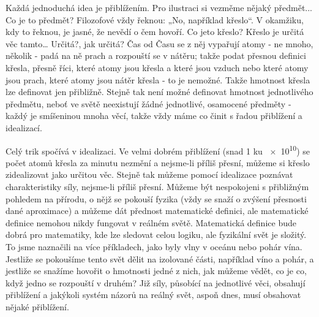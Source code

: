 {    Každá jednoduchá idea je přiblížením. Pro ilustraci si vezměme nějaký předmět... Co je to 
    předmět? Filozofové vždy řeknou: „No, například křeslo“. V okamžiku, kdy to řeknou, je jasné, 
    že nevědí o čem hovoří. Co jeto křeslo? Křeslo je určitá věc tamto… Určitá?, jak určitá? Čas od 
    Času se z něj vypařují atomy - ne mnoho, několik - padá na ně prach a rozpouští se v nátěru; 
    takže podat přesnou definici křesla, přesně říci, které atomy jsou křesla a které jsou vzduch 
    nebo které atomy jsou prach, které atomy jsou nátěr křesla - to je nemožné. Takže hmotnost 
    křesla lze definovat jen přibližně. Stejně tak není možné definovat hmotnost jednotlivého 
    předmětu, neboť ve světě neexistují žádné jednotlivé, osamocené předměty - každý je smíšeninou 
    mnoha věcí, takže vždy máme co činit s řadou přiblížení a idealizací.
    
    Celý trik spočívá v idealizaci. Ve velmi dobrém přiblížení (snad 1 ku \num{e10}) se počet atomů 
    křesla za minutu nezmění a nejsme-li příliš přesní, můžeme si křeslo zidealizovat jako určitou 
    věc. Stejně tak můžeme pomocí idealizace poznávat charakteristiky síly, nejsme-li příliš 
    přesní. Můžeme být nespokojeni s přibližným pohledem na přírodu, o nějž se pokouší fyzika (vždy 
    se snaží o zvýšení přesnosti dané aproximace) a můžeme dát přednost matematické definici, ale 
    matematické definice nemohou nikdy fungovat v reálném světě. Matematická definice bude dobrá 
    pro matematiky, kde lze sledovat celou logiku, ale fyzikální svět je složitý. To jsme naznačili 
    na více příkladech, jako byly vlny v oceánu nebo pohár vína. Jestliže se pokoušíme tento svět 
    dělit na izolované části, například víno a pohár, a jestliže se snažíme hovořit o hmotnosti 
    jedné z nich, jak můžeme vědět, co je co, když jedno se rozpouští v druhém? Již síly, působící 
    na jednotlivé věci, obsahují přiblížení a jakýkoli systém názorů na reálný svět, aspoň dnes, 
    musí obsahovat nějaké přiblížení.
    
}
